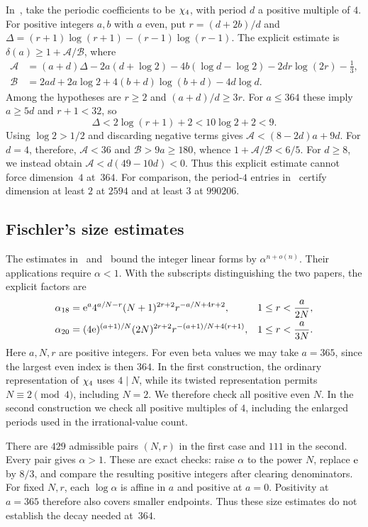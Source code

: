 In~\cite[Theorem~5.5]{N11}, take the periodic coefficients to be $\chi_4$,
with period $d$ a positive multiple of $4$. For positive integers $a,b$
with $a$ even, put $r=(d+2b)/d$ and
$\Delta=(r+1)\log(r+1)-(r-1)\log(r-1)$.
The explicit estimate is $\delta(a)\geq1+\mathcal A/\mathcal B$, where
\begin{align*}
 \mathcal A&=(a+d)\Delta-2a(d+\log2)
       -4b(\log d-\log2)-2dr\log(2r)-\tfrac13,\\
 \mathcal B&=2ad+2a\log2+4(b+d)\log(b+d)-4d\log d.
\end{align*}
Among the hypotheses are $r\geq2$ and $(a+d)/d\geq3r$.
For $a\leq364$ these imply $a\geq5d$ and $r+1<32$, so
\[
 \Delta<2\log(r+1)+2<10\log2+2<9.
\]
Using $\log2>1/2$ and discarding negative terms gives
$\mathcal A<(8-2d)a+9d$.
For $d=4$, therefore, $\mathcal A<36$ and
$\mathcal B>9a\geq180$, whence $1+\mathcal A/\mathcal B<6/5$.
For $d\geq8$, we instead obtain
$\mathcal A<d(49-10d)<0$.
Thus this explicit estimate cannot force dimension~$4$ at~$364$.
For comparison, the period-$4$ entries in~\cite[Table~5]{N11} certify
dimension at least $2$ at $2594$ and at least $3$ at $990206$.

\subsection{Fischler's size estimates}

The estimates in~\cite[Section~4.2 and Proposition~4.4]{F18}
and~\cite[Proposition~1, (1.1)]{F20} bound the integer linear forms by
$\alpha^{n+o(n)}$. Their applications require $\alpha<1$.
With the subscripts distinguishing the two papers, the explicit factors are
\begin{align*}
 \alpha_{18}&=\mathrm e^a4^{a/N-r}(N+1)^{2r+2}r^{-a/N+4r+2},
       &1\leq r&<\frac{a}{2N},\\
 \alpha_{20}&=(4\mathrm e)^{(a+1)/N}(2N)^{2r+2}r^{-(a+1)/N+4(r+1)},
       &1\leq r&<\frac{a}{3N}.
\end{align*}
Here $a,N,r$ are positive integers. For even beta values we may take
$a=365$, since the largest even index is then $364$.
In the first construction, the ordinary representation of $\chi_4$ uses
$4\mid N$, while its twisted representation permits $N\equiv2\pmod4$,
including $N=2$. We therefore check all positive even $N$.
In the second construction we check all positive multiples of $4$,
including the enlarged periods used in the irrational-value count.

There are $429$ admissible pairs $(N,r)$ in the first case and $111$ in
the second. Every pair gives $\alpha>1$. These are exact checks:
raise $\alpha$ to the power $N$, replace $\mathrm e$ by $8/3$, and compare
the resulting positive integers after clearing denominators.
For fixed $N,r$, each $\log\alpha$ is affine in $a$ and positive at
$a=0$. Positivity at $a=365$ therefore also covers smaller endpoints.
Thus these size estimates do not establish the decay needed at~$364$.

